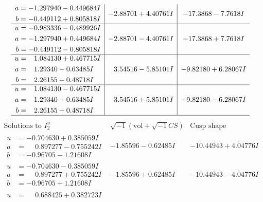 \documentclass[1p]{elsarticle_modified}
\theoremstyle{definition}
\newcommand{\I}{\sqrt{-1}}
\begin{document}
$$\begin{array}{c|c|c}
\begin{aligned}
a &= -1.297940 - 0.449684 I \\
b &= -0.449112 + 0.805818 I\end{aligned}
 & -2.88701 + 4.40761 I & -17.3868 - 7.7618 I \\ \hline\begin{aligned}
u &= -0.983336 - 0.489926 I \\
a &= -1.297940 + 0.449684 I \\
b &= -0.449112 - 0.805818 I\end{aligned}
 & -2.88701 - 4.40761 I & -17.3868 + 7.7618 I \\ \hline\begin{aligned}
u &= \phantom{-}1.084130 + 0.467715 I \\
a &= \phantom{-}1.29340 - 0.63485 I \\
b &= \phantom{-}2.26155 - 0.48718 I\end{aligned}
 & \phantom{-}3.54516 - 5.85101 I & -9.82180 + 6.28067 I \\ \hline\begin{aligned}
u &= \phantom{-}1.084130 - 0.467715 I \\
a &= \phantom{-}1.29340 + 0.63485 I \\
b &= \phantom{-}2.26155 + 0.48718 I\end{aligned}
 & \phantom{-}3.54516 + 5.85101 I & -9.82180 - 6.28067 I\\
 \hline 
 \end{array}$$\newpage$$\begin{array}{c|c|c}  
\text{Solutions to }I^u_{2}& \I (\text{vol} + \sqrt{-1}CS) & \text{Cusp shape}\\
 \hline 
\begin{aligned}
u &= -0.704630 + 0.385059 I \\
a &= \phantom{-}0.897277 - 0.755242 I \\
b &= -0.96705 - 1.21608 I\end{aligned}
 & -1.85596 - 0.62485 I & -10.44943 + 4.04776 I \\ \hline\begin{aligned}
u &= -0.704630 - 0.385059 I \\
a &= \phantom{-}0.897277 + 0.755242 I \\
b &= -0.96705 + 1.21608 I\end{aligned}
 & -1.85596 + 0.62485 I & -10.44943 - 4.04776 I \\ \hline\begin{aligned}
u &= \phantom{-}0.688425 + 0.382723 I \\

\end{aligned}
\end{array}$$
\end{document}
